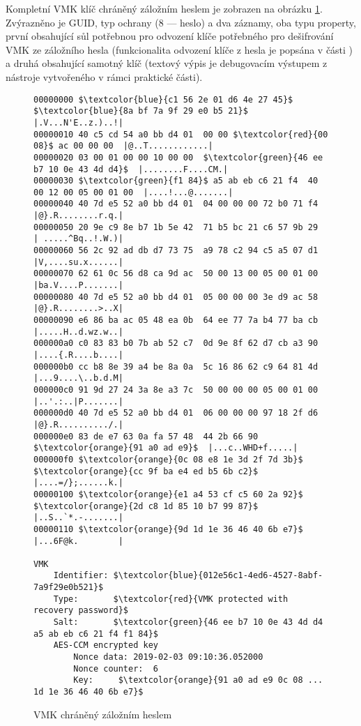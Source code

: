 Kompletní VMK klíč chráněný záložním heslem je zobrazen na obrázku \ref{fig:vmk-bpwprotected}. Zvýrazněno je GUID, typ ochrany (8 --- heslo) a dva  záznamy, oba typu property, první obsahující sůl potřebnou pro odvození klíče potřebného pro dešifrování VMK ze záložního hesla (funkcionalita odvození klíče z hesla je popsána v části ) a druhá obsahující samotný klíč (textový výpis je debugovacím výstupem z nástroje vytvořeného v rámci praktické části).

\begin{figure}[h]
		\centering
		\captionsetup{width=0.65\linewidth}
\begin{lstlisting}[frame=none, escapechar=$, basicstyle=\ttfamily\small, columns=fullflexible, keepspaces=true]
00000000 $\textcolor{blue}{c1 56 2e 01 d6 4e 27 45}$  $\textcolor{blue}{8a bf 7a 9f 29 e0 b5 21}$  |.V...N'E..z.)..!|
00000010 40 c5 cd 54 a0 bb d4 01  00 00 $\textcolor{red}{00 08}$ ac 00 00 00  |@..T............|
00000020 03 00 01 00 00 10 00 00  $\textcolor{green}{46 ee b7 10 0e 43 4d d4}$  |........F....CM.|
00000030 $\textcolor{green}{f1 84}$ a5 ab eb c6 21 f4  40 00 12 00 05 00 01 00  |....!...@.......|
00000040 40 7d e5 52 a0 bb d4 01  04 00 00 00 72 b0 71 f4  |@}.R........r.q.|
00000050 20 9e c9 8e b7 1b 5e 42  71 b5 bc 21 c6 57 9b 29  | .....^Bq..!.W.)|
00000060 56 2c 92 ad db d7 73 75  a9 78 c2 94 c5 a5 07 d1  |V,....su.x......|
00000070 62 61 0c 56 d8 ca 9d ac  50 00 13 00 05 00 01 00  |ba.V....P.......|
00000080 40 7d e5 52 a0 bb d4 01  05 00 00 00 3e d9 ac 58  |@}.R........>..X|
00000090 e6 86 ba ac 05 48 ea 0b  64 ee 77 7a b4 77 ba cb  |.....H..d.wz.w..|
000000a0 c0 83 83 b0 7b ab 52 c7  0d 9e 8f 62 d7 cb a3 90  |....{.R....b....|
000000b0 cc b8 8e 39 a4 be 8a 0a  5c 16 86 62 c9 64 81 4d  |...9....\..b.d.M|
000000c0 91 9d 27 24 3a 8e a3 7c  50 00 00 00 05 00 01 00  |..'.:..|P.......|
000000d0 40 7d e5 52 a0 bb d4 01  06 00 00 00 97 18 2f d6  |@}.R........../.|
000000e0 83 de e7 63 0a fa 57 48  44 2b 66 90 $\textcolor{orange}{91 a0 ad e9}$  |...c..WHD+f.....|
000000f0 $\textcolor{orange}{0c 08 e8 1e 3d 2f 7d 3b}$  $\textcolor{orange}{cc 9f ba e4 ed b5 6b c2}$  |....=/};......k.|
00000100 $\textcolor{orange}{e1 a4 53 cf c5 60 2a 92}$  $\textcolor{orange}{2d c8 1d 85 10 b7 99 87}$  |..S..`*.-.......|
00000110 $\textcolor{orange}{9d 1d 1e 36 46 40 6b e7}$                           |...6F@k.        |

VMK
	Identifier:	$\textcolor{blue}{012e56c1-4ed6-4527-8abf-7a9f29e0b521}$
	Type:		$\textcolor{red}{VMK protected with recovery password}$
	Salt:		$\textcolor{green}{46 ee b7 10 0e 43 4d d4 a5 ab eb c6 21 f4 f1 84}$
	AES-CCM encrypted key
		Nonce data:	2019-02-03 09:10:36.052000
		Nonce counter:	6
		Key:	 $\textcolor{orange}{91 a0 ad e9 0c 08 ... 1d 1e 36 46 40 6b e7}$
\end{lstlisting}
		\caption{VMK chráněný záložním heslem}
		\label{fig:vmk-bpwprotected}
\end{figure}


